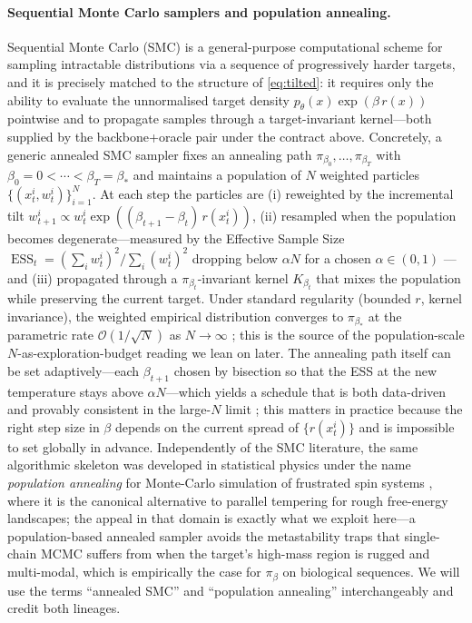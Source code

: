 \documentclass{article}
\theoremstyle{definition}
\theoremstyle{remark}
\newcommand{\ESS}{\operatorname{ESS}}
\begin{document}
\paragraph{Sequential Monte Carlo samplers and population annealing.}
Sequential Monte Carlo (SMC) is a general-purpose computational scheme for sampling intractable distributions via a sequence of progressively harder targets, and it is precisely matched to the structure of \eqref{eq:tilted}: it requires only the ability to evaluate the unnormalised target density $p_\theta(x)\exp(\beta\,r(x))$ pointwise and to propagate samples through a target-invariant kernel---both supplied by the backbone+oracle pair under the contract above. Concretely, a generic annealed SMC sampler \citep{delmoral2006smc,naesseth2019elements} fixes an annealing path $\pi_{\beta_0},\dots,\pi_{\beta_T}$ with $\beta_0\!=\!0\!<\!\cdots\!<\!\beta_T\!=\!\beta_*$ and maintains a population of $N$ weighted particles $\{(x_t^i,w_t^i)\}_{i=1}^N$. At each step the particles are (i) reweighted by the incremental tilt $w_{t+1}^i\!\propto\! w_t^i\exp((\beta_{t+1}\!-\!\beta_t)\,r(x_t^i))$, (ii) resampled when the population becomes degenerate---measured by the Effective Sample Size $\ESS_t=(\sum_i w_t^i)^2/\sum_i (w_t^i)^2$ dropping below $\alpha N$ for a chosen $\alpha\!\in\!(0,1)$ \citep{liuchen1995}---and (iii) propagated through a $\pi_{\beta_t}$-invariant kernel $K_{\beta_t}$ that mixes the population while preserving the current target. Under standard regularity (bounded $r$, kernel invariance), the weighted empirical distribution converges to $\pi_{\beta_*}$ at the parametric rate $\mathcal{O}(1/\sqrt{N})$ as $N\!\to\!\infty$ \citep{delmoral2006smc}; this is the source of the population-scale $N$-as-exploration-budget reading we lean on later. The annealing path itself can be set adaptively---each $\beta_{t+1}$ chosen by bisection so that the ESS at the new temperature stays above $\alpha N$---which yields a schedule that is both data-driven and provably consistent in the large-$N$ limit \citep{delmoral2012adaptive}; this matters in practice because the right step size in $\beta$ depends on the current spread of $\{r(x_t^i)\}$ and is impossible to set globally in advance. Independently of the SMC literature, the same algorithmic skeleton was developed in statistical physics under the name \emph{population annealing} for Monte-Carlo simulation of frustrated spin systems \citep{hukushima2003pa,machta2010pa,wang2015pa}, where it is the canonical alternative to parallel tempering for rough free-energy landscapes; the appeal in that domain is exactly what we exploit here---a population-based annealed sampler avoids the metastability traps that single-chain MCMC suffers from when the target's high-mass region is rugged and multi-modal, which is empirically the case for $\pi_\beta$ on biological sequences. We will use the terms ``annealed SMC'' and ``population annealing'' interchangeably and credit both lineages.
\end{document}

